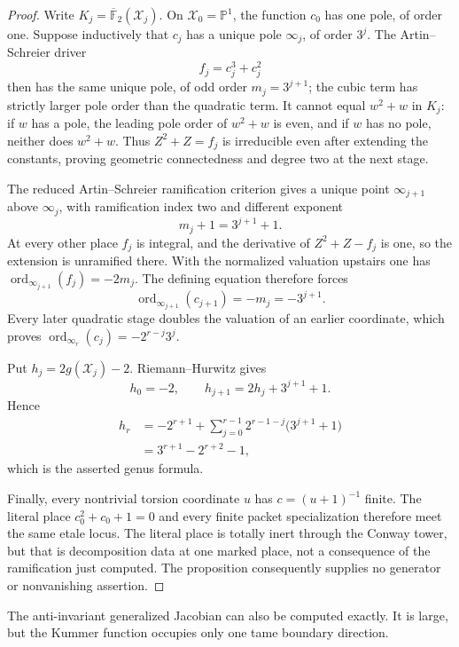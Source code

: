 \documentclass[11pt]{article}
\theoremstyle{definition}
\theoremstyle{remark}
\begin{document}
\begin{proof}
Write $K_j=\overline{\mathbb F}_2(\mathcal X_j)$.  On
$\mathcal X_0=\mathbb P^1$, the function $c_0$ has one pole, of order one.
Suppose inductively that $c_j$ has a unique pole $\infty_j$, of order
$3^j$.  The Artin--Schreier driver
\[
 f_j=c_j^3+c_j^2
\]
then has the same unique pole, of odd order $m_j=3^{j+1}$; the cubic term
has strictly larger pole order than the quadratic term.  It cannot equal
$w^2+w$ in $K_j$: if $w$ has a pole, the leading pole order of $w^2+w$ is
even, and if $w$ has no pole, neither does $w^2+w$.  Thus
$Z^2+Z=f_j$ is irreducible even after extending the constants, proving
geometric connectedness and degree two at the next stage.

The reduced Artin--Schreier ramification criterion gives a unique point
$\infty_{j+1}$ above $\infty_j$, with ramification index two and different
exponent
\[
 m_j+1=3^{j+1}+1.
\]
At every other place $f_j$ is integral, and the derivative of
$Z^2+Z-f_j$ is one, so the extension is unramified there.  With the
normalized valuation upstairs one has
$\operatorname{ord}_{\infty_{j+1}}(f_j)=-2m_j$.  The defining equation
therefore forces
\[
 \operatorname{ord}_{\infty_{j+1}}(c_{j+1})=-m_j=-3^{j+1}.
\]
Every later quadratic stage doubles the valuation of an earlier coordinate,
which proves
$\operatorname{ord}_{\infty_r}(c_j)=-2^{r-j}3^j$.

Put $h_j=2g(\mathcal X_j)-2$.  Riemann--Hurwitz gives
\[
 h_0=-2,
 \qquad
 h_{j+1}=2h_j+3^{j+1}+1.
\]
Hence
\begin{align*}
 h_r
 &= -2^{r+1}
    +\sum_{j=0}^{r-1}2^{r-1-j}\bigl(3^{j+1}+1\bigr)\\
 &=3^{r+1}-2^{r+2}-1,
\end{align*}
which is the asserted genus formula.

Finally, every nontrivial torsion coordinate $u$ has
$c=(u+1)^{-1}$ finite.  The literal place $c_0^2+c_0+1=0$ and every finite
packet specialization therefore meet the same etale locus.  The literal
place is totally inert through the Conway tower, but that is decomposition
data at one marked place, not a consequence of the ramification just
computed.  The proposition consequently supplies no generator or
nonvanishing assertion.
\end{proof}

The anti-invariant generalized Jacobian can also be computed exactly.  It is
large, but the Kummer function occupies only one tame boundary direction.
\end{document}
